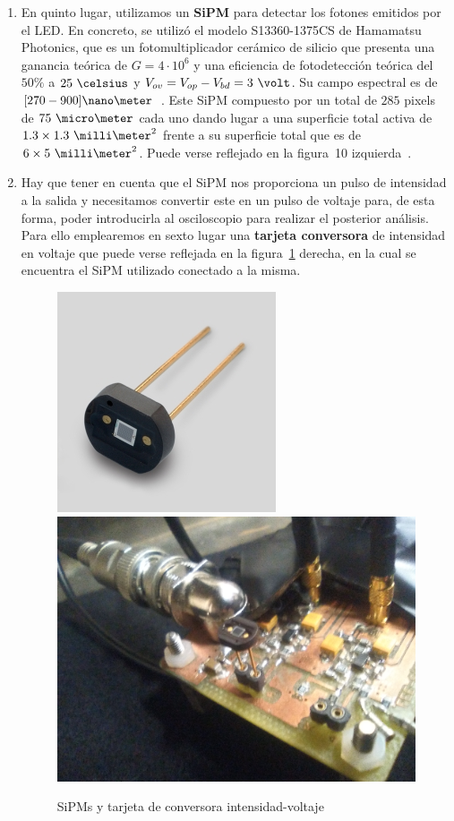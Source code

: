 \begin{enumerate}
\item {} En quinto lugar, utilizamos un \textbf{SiPM} para detectar los fotones emitidos por el LED. En concreto, se utilizó el modelo S13360-1375CS de Hamamatsu Photonics, que es un fotomultiplicador cerámico de silicio que presenta una ganancia teórica de $G=4 \cdotp 10^6$ y una eficiencia de fotodetección teórica del $50\%$ a $25~\celsius$ y $V_{ov}=V_{op}-V_{bd}=3~\volt$. Su campo espectral  es de $[270-900]\nano\meter$~\cite{datasheet SiPM}.
Este SiPM compuesto por un total de $285$ pixels de $75~\micro\meter$ cada uno dando lugar a una superficie total activa de $1.3\times1.3~\milli\meter^2$ frente a su superficie total que es de $6\times5~\milli\meter^2$. Puede verse reflejado en la figura~10 izquierda~\cite{datasheet SiPM}. 

\item {} Hay que tener en cuenta que el SiPM nos proporciona un pulso de intensidad a la salida y  necesitamos convertir este en un pulso de voltaje para, de esta forma, poder introducirla al osciloscopio para realizar el posterior análisis. Para ello emplearemos en sexto lugar una \textbf{tarjeta conversora} de intensidad en voltaje que puede verse reflejada en la figura~\ref{TarjetaSiPM} derecha, en la cual se encuentra el SiPM utilizado conectado a la misma. 

\begin{figure}[htb]
\centering
{
\includegraphics[scale=0.55]{SiPM.png} 
}
{
\includegraphics[scale=0.25]{tarjeta.png} 
}
\caption{SiPMs y tarjeta de conversora intensidad-voltaje\label{TarjetaSiPM}}
\end{figure}


\end{enumerate}
